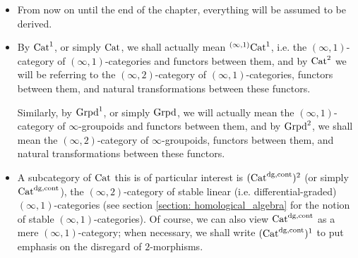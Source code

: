         \begin{convention} \label{conv: schemes_2_everything_is_derived}
            \noindent
            \begin{itemize}
                \item From now on until the end of the chapter, everything will be assumed to be derived. 
                \item By $\mathrm{Cat}^1$, or simply $\mathrm{Cat}$, we shall actually mean ${}^{(\infty, 1)}\mathrm{Cat}^1$, i.e. the $(\infty, 1)$-category of $(\infty, 1)$-categories and functors between them, and by $\mathrm{Cat}^2$ we will be referring to the $(\infty, 2)$-category of $(\infty, 1)$-categories, functors between them, and natural transformations between these functors. 
                
                Similarly, by $\mathrm{Grpd}^1$, or simply $\mathrm{Grpd}$, we will actually mean the $(\infty, 1)$-category of $\infty$-groupoids and functors between them, and by $\mathrm{Grpd}^2$, we shall mean the $(\infty, 2)$-category of $\infty$-groupoids, functors between them, and natural transformations between these functors.
                \item A subcategory of $\mathrm{Cat}$ this is of particular interest is $(\mathrm{Cat}^{\mathrm{dg}, \mathrm{cont}})^2$ (or simply $\mathrm{Cat}^{\mathrm{dg}, \mathrm{cont}}$), the $(\infty, 2)$-category of stable linear (i.e. differential-graded) $(\infty, 1)$-categories (see section \ref{section: homological_algebra} for the notion of stable $(\infty, 1)$-categories). Of course, we can also view $\mathrm{Cat}^{\mathrm{dg}, \mathrm{cont}}$ as a mere $(\infty, 1)$-category; when necessary, we shall write $(\mathrm{Cat}^{\mathrm{dg}, \mathrm{cont}})^1$ to put emphasis on the disregard of $2$-morphisms.
            \end{itemize} 
        \end{convention}
        
